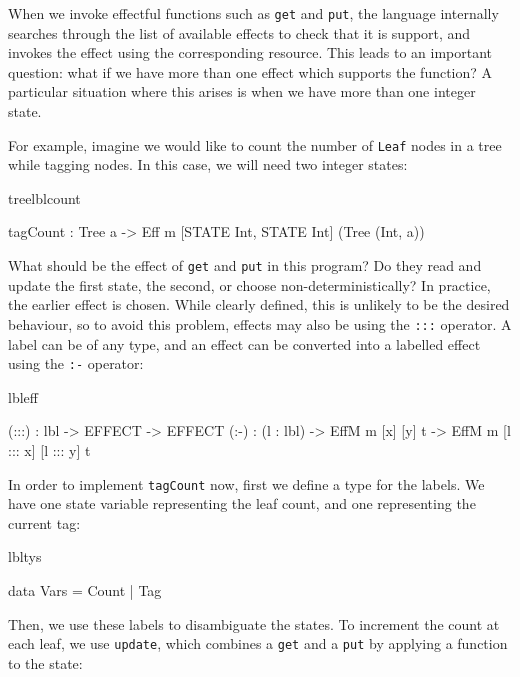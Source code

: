 When we invoke effectful functions such as \texttt{get} and \texttt{put},
the \Eff{} language internally searches through the list of available effects
to check that it is support, and invokes the effect using the corresponding
resource. This leads to an important question: what if we have more than one 
effect which supports the function? A particular situation where this arises
is when we have more than one integer state.

For example, imagine we would like to count the number of \texttt{Leaf} nodes
in a tree while tagging nodes.  In this case, we will need two integer states:

\begin{SaveVerbatim}{treelblcount}

tagCount : Tree a -> 
     Eff m [STATE Int, STATE Int] (Tree (Int, a))

\end{SaveVerbatim}

What should be the effect of \texttt{get} and \texttt{put} in this program?
Do they read and update the first state, the second, or choose
non-deterministically? 
%
In practice, the earlier effect is chosen. While clearly defined, this is
unlikely to be the desired behaviour, so 
to avoid this problem, effects may also be  using the
\texttt{:::} operator.  A label can be of any type, and an
effect can be converted into a labelled effect using the \texttt{:-}
operator:

\begin{SaveVerbatim}{lbleff}

(:::) : lbl -> EFFECT -> EFFECT
(:-)  : (l : lbl) -> EffM m [x] [y] t -> 
                     EffM m [l ::: x] [l ::: y] t

\end{SaveVerbatim}

\noindent
In order to implement \texttt{tagCount} now, first we define a type for the
labels. We have one state variable representing the leaf count, and one
representing the current tag:

\begin{SaveVerbatim}{lbltys}

data Vars = Count | Tag

\end{SaveVerbatim}

\noindent
Then, we use these labels to disambiguate the states. To increment the count
at each leaf, we use \texttt{update}, which combines a \texttt{get} and a
\texttt{put} by applying a function to the state:

